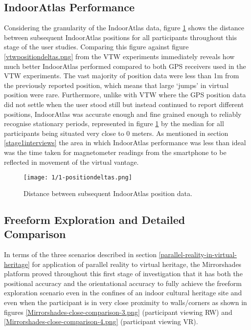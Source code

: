 
\subsection{IndoorAtlas Performance}

Considering the granularity of the IndoorAtlas data, figure \ref{1-positiondeltas.png} shows the distance between subsequent IndoorAtlas positions for all participants throughout this stage of the user studies. Comparing this figure against figure \ref{vtwpositiondeltas.png} from the VTW experiments immediately reveals how much better IndoorAtlas performed compared to both GPS receivers used in the VTW experiments. The vast majority of position data were less than 1m from the previously reported position, which means that large `jumps' in virtual position were rare. Furthermore, unlike with VTW where the GPS position data did not settle when the user stood still but instead continued to report different positions, IndoorAtlas was accurate enough and fine grained enough to reliably recognise stationary periods, represented in figure \ref{1-positiondeltas.png} by the median for all participants being situated very close to 0 meters. As mentioned in section \ref{stage1interviews} the area in which IndoorAtlas performance was less than ideal was the time taken for magnetometer readings from the smartphone to be reflected in movement of the virtual vantage.

\begin{figure}[ht]
	\begin{center}
		\texttt{[image: 1/1-positiondeltas.png]}
		\caption{Distance between subsequent IndoorAtlas position data.}
		\label{1-positiondeltas.png}
	\end{center}
\end{figure}


\subsection{Freeform Exploration and Detailed Comparison}

In terms of the three scenarios described in section \ref{parallel-reality-in-virtual-heritage} for application of parallel reality to virtual heritage, the Mirrorshades platform proved throughout this first stage of investigation that it has both the positional accuracy and the orientational accuracy to fully achieve the freeform exploration scenario even in the confines of an indoor cultural heritage site and even when the participant is in very close proximity to walls/corners as shown in figures \ref{Mirrorshades-close-comparison-3.png} (participant viewing RW) and \ref{Mirrorshades-close-comparison-4.png} (participant viewing VR).

